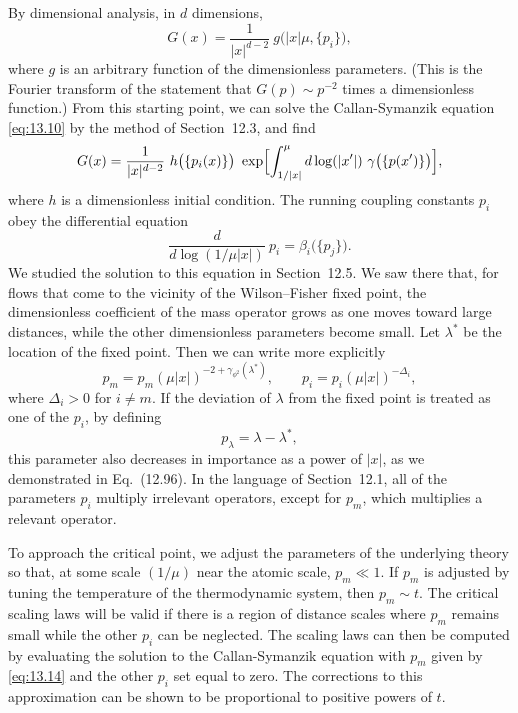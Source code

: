 By dimensional analysis, in $d$ dimensions,
\begin{equation}
  G(x) = \frac{1}{|x|^{d-2}}\ g\bigl( |x|\mu, \{p_i\} \bigr) ,
  \label{eq:13.11}
\end{equation}
where $g$ is an arbitrary function of the dimensionless parameters.  (This is
the Fourier transform of the statement that $G(p) \sim p^{-2}$ times a
dimensionless function.)  From this starting point, we can solve the
Callan-Symanzik equation \eqref{eq:13.10} by the method of Section~12.3, and
find
\begin{equation}
  G(x) = \frac{1}{|x|^{d-2}}\ h\bigl( \{p_i(x)\} \bigr)\ \exp\Bigl[
    \int_{1/|x|}^{\mu} d\log(|x'|)\ \gamma\bigl( \{p(x')\} \bigr) \Bigr] ,
  \label{eq:13.12}
\end{equation}
where $h$ is a dimensionless initial condition.  The running coupling
constants $p_i$ obey the differential equation
\begin{equation}
  \frac{d}{d\log(1/\mu|x|)}\ p_i = \beta_i\bigl( \{p_j\} \bigr) .
  \label{eq:13.13}
\end{equation}
We studied the solution to this equation in Section~12.5.  We saw there that,
for flows that come to the vicinity of the Wilson--Fisher fixed point, the
dimensionless coefficient of the mass operator grows as one moves toward
large distances, while the other dimensionless parameters become small.  Let
$\lambda^{*}$ be the location of the fixed point.  Then we can write more
explicitly
\begin{equation}
  p_m = p_m(\mu|x|)^{-2+\gamma_{\phi^2}(\lambda^{*})},
  \qquad p_i = p_i(\mu|x|)^{-\Delta_i} ,
  \label{eq:13.14}
\end{equation}
where $\Delta_i > 0$ for $i \neq m$.  If the deviation of $\lambda$ from the
fixed point is treated as one of the $p_i$, by defining
\begin{equation}
  p_\lambda = \lambda - \lambda^{*} ,
  \label{eq:13.15}
\end{equation}
this parameter also decreases in importance as a power of $|x|$, as we
demonstrated in Eq.~(12.96).  In the language of Section~12.1, all
of the parameters $p_i$ multiply irrelevant operators, except for $p_m$, which
multiplies a relevant operator.

To approach the critical point, we adjust the parameters of the underlying
theory so that, at some scale $(1/\mu)$ near the atomic scale, $p_m \ll 1$.
If $p_m$ is adjusted by tuning the temperature of the thermodynamic system,
then $p_m \sim t$.  The critical scaling laws will be valid if there is a
region of distance scales where $p_m$ remains small while the other $p_i$ can
be neglected.  The scaling laws can then be computed by evaluating the
solution to the Callan-Symanzik equation with $p_m$ given by \eqref{eq:13.14}
and the other $p_i$ set equal to zero.  The corrections to this approximation
can be shown to be proportional to positive powers of $t$.

